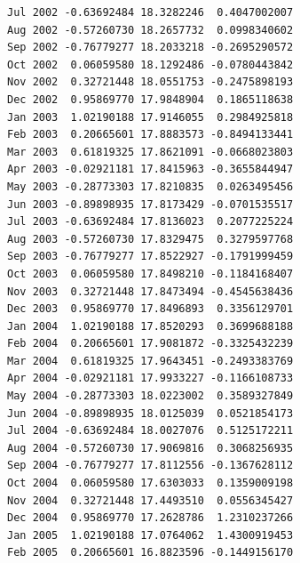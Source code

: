 \documentclass[
  11pt,
  a4paper,
]{report}
\begin{document}
\begin{verbatim}
Jul 2002 -0.63692484 18.3282246  0.4047002007
Aug 2002 -0.57260730 18.2657732  0.0998340602
Sep 2002 -0.76779277 18.2033218 -0.2695290572
Oct 2002  0.06059580 18.1292486 -0.0780443842
Nov 2002  0.32721448 18.0551753 -0.2475898193
Dec 2002  0.95869770 17.9848904  0.1865118638
Jan 2003  1.02190188 17.9146055  0.2984925818
Feb 2003  0.20665601 17.8883573 -0.8494133441
Mar 2003  0.61819325 17.8621091 -0.0668023803
Apr 2003 -0.02921181 17.8415963 -0.3655844947
May 2003 -0.28773303 17.8210835  0.0263495456
Jun 2003 -0.89898935 17.8173429 -0.0701535517
Jul 2003 -0.63692484 17.8136023  0.2077225224
Aug 2003 -0.57260730 17.8329475  0.3279597768
Sep 2003 -0.76779277 17.8522927 -0.1791999459
Oct 2003  0.06059580 17.8498210 -0.1184168407
Nov 2003  0.32721448 17.8473494 -0.4545638436
Dec 2003  0.95869770 17.8496893  0.3356129701
Jan 2004  1.02190188 17.8520293  0.3699688188
Feb 2004  0.20665601 17.9081872 -0.3325432239
Mar 2004  0.61819325 17.9643451 -0.2493383769
Apr 2004 -0.02921181 17.9933227 -0.1166108733
May 2004 -0.28773303 18.0223002  0.3589327849
Jun 2004 -0.89898935 18.0125039  0.0521854173
Jul 2004 -0.63692484 18.0027076  0.5125172211
Aug 2004 -0.57260730 17.9069816  0.3068256935
Sep 2004 -0.76779277 17.8112556 -0.1367628112
Oct 2004  0.06059580 17.6303033  0.1359009198
Nov 2004  0.32721448 17.4493510  0.0556345427
Dec 2004  0.95869770 17.2628786  1.2310237266
Jan 2005  1.02190188 17.0764062  1.4300919453
Feb 2005  0.20665601 16.8823596 -0.1449156170


\end{verbatim}
\end{document}
